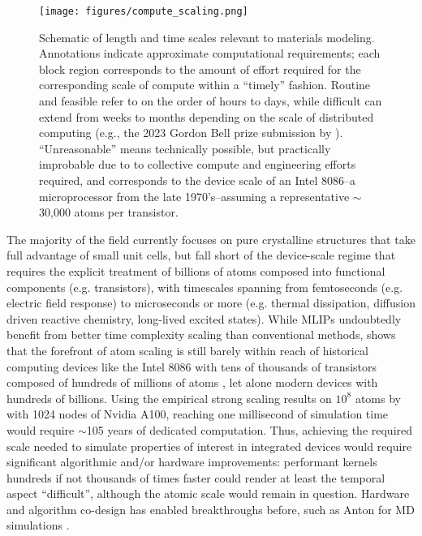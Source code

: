 \begin{figure}[ht]
    \centering
    \texttt{[image: figures/compute\_scaling.png]}
    \vspace{-0.90cm}
    \caption{Schematic of length and time scales relevant to materials modeling. Annotations indicate approximate computational requirements; each block region corresponds to the amount of effort required for the corresponding scale of compute within a ``timely'' fashion. Routine and feasible refer to on the order of hours to days, while difficult can extend from weeks to months depending on the scale of distributed computing (e.g., the 2023 Gordon Bell prize submission by \citet{kozinsky2023scaling}). ``Unreasonable'' means technically possible, but practically improbable due to to collective compute and engineering efforts required, and corresponds to the device scale of an Intel 8086--a microprocessor from the late 1970's--assuming a representative ${\sim}$30,000 atoms per transistor.}
    \label{fig:compute-scales}
    \vspace{-0.60cm}
\end{figure}


The majority of the field currently focuses on pure crystalline structures that take full advantage of small unit cells, but fall short of the device-scale regime that requires the explicit treatment of billions of atoms composed into functional components (e.g. transistors), with timescales spanning from femtoseconds (e.g. electric field response) to microseconds or more (e.g. thermal dissipation, diffusion driven reactive chemistry, long-lived excited states). While MLIPs undoubtedly benefit from better time complexity scaling than conventional methods,  shows that the forefront of atom scaling is still barely within reach of historical computing devices like the Intel 8086 with tens of thousands of transistors composed of hundreds of millions of atoms \citep{kozinsky2023scaling}, let alone modern devices with hundreds of billions. Using the empirical strong scaling results on $10^8$ atoms by \citet{kozinsky2023scaling} with 1024 nodes of Nvidia A100, reaching one millisecond of simulation time would require ${\sim}$105 years of dedicated computation. Thus, achieving the required scale needed to simulate properties of interest in integrated devices would require significant algorithmic and/or hardware improvements: performant kernels hundreds if not thousands of times faster could render at least the temporal aspect ``difficult'', although the atomic scale would remain in question. Hardware and algorithm co-design has enabled breakthroughs before, such as Anton for MD simulations \citep{shaw2021anton}. 

